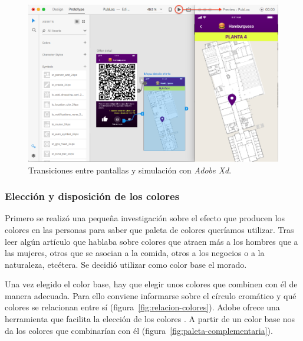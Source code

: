 \begin{figure}[tb]
\centering
\includegraphics[scale=0.4]{figures/simulacion-xd.png}
\caption{Transiciones entre pantallas y simulación con \textit{Adobe Xd}.\label{fig:simula-xd}}
\end{figure}

\subsubsection*{Elección y disposición de los colores}
Primero se realizó una pequeña investigación sobre el efecto que producen los colores en las personas para saber que paleta de colores queríamos utilizar. Tras leer algún artículo \cite{noauthor_color_nodate} que hablaba sobre colores que atraen más a los hombres que a las mujeres, otros que se asocian a la comida, otros a los negocios o a la naturaleza, etcétera. Se decidió utilizar como color base el morado.

Una vez elegido el color base, hay que elegir unos colores que combinen con él de manera adecuada. Para ello conviene informarse sobre el círculo cromático y qué colores se relacionan entre sí (figura~\ref{fig:relacion-colores}).
Adobe ofrece una herramienta que facilita la elección de los colores \cite{noauthor_adobe_nodate}. A partir de un color base nos da los colores que combinarían con él (figura~\ref{fig:paleta-complementaria}).

